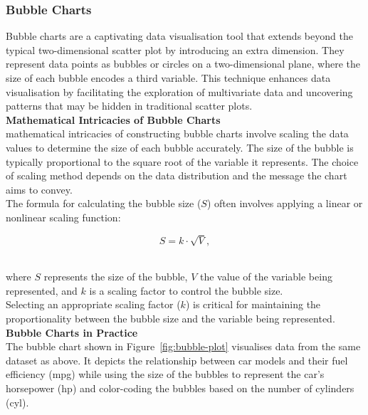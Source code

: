 \documentclass{article}\usepackage[]{graphicx}\usepackage[]{xcolor}
\begin{document}
\subsubsection{Bubble Charts}
Bubble charts are a captivating data visualisation tool that extends beyond the typical two-dimensional scatter plot by introducing an extra dimension. They represent data points as bubbles or circles on a two-dimensional plane, where the size of each bubble encodes a third variable. This technique enhances data visualisation by facilitating the exploration of multivariate data and uncovering patterns that may be hidden in traditional scatter plots.\\


\noindent
\textbf{Mathematical Intricacies of Bubble Charts}\\
\noindentThe mathematical intricacies of constructing bubble charts involve scaling the data values to determine the size of each bubble accurately. The size of the bubble is typically proportional to the square root of the variable it represents. The choice of scaling method depends on the data distribution and the message the chart aims to convey.\\

\noindent
The formula for calculating the bubble size (\(S\)) often involves applying a linear or nonlinear scaling function:

\[
S = k \cdot \sqrt{V},
\]

\\
\noident where \(S\) represents the size of the bubble, \(V\) the value of the variable being represented, and \(k\) is a scaling factor to control the bubble size.\\

\noindent
Selecting an appropriate scaling factor (\(k\)) is critical for maintaining the proportionality between the bubble size and the variable being represented.\\

\noindent
\textbf{Bubble Charts in Practice}\\
\noident The bubble chart shown in Figure~\ref{fig:bubble-plot} visualises data from the same dataset as above. It depicts the relationship between car models and their fuel efficiency (mpg) while using the size of the bubbles to represent the car's horsepower (hp) and color-coding the bubbles based on the number of cylinders (cyl).\\
\end{document}
